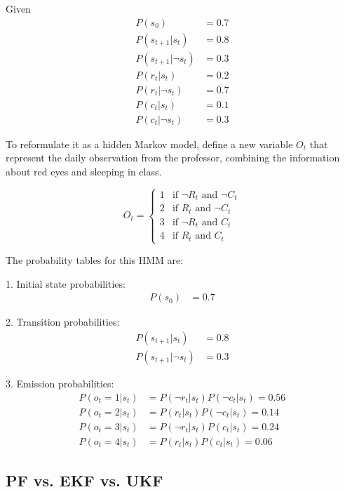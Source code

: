 \documentclass{article}
\theoremstyle{definition} %
\begin{document}
Given
\begin{align*}
        P(s_0) & =0.7 \\
        P(s_{t+1} | s_t) & =0.8 \\
        P(s_{t+1} | \neg s_t) & =0.3 \\
        P(r_t | s_t) & =0.2 \\
        P(r_t | \neg s_t) & =0.7 \\
        P(c_t | s_t) & =0.1 \\
        P(c_t | \neg s_t) & =0.3
\end{align*}

To reformulate it as a hidden Markov model, define a new variable $O_t$ that represent the daily observation from the professor, combining the information about red eyes and sleeping in class.

\[
    O_t = 
    \begin{cases} 
    1 & \text{if } \neg R_t \text{ and } \neg C_t \\
    2 & \text{if } R_t \text{ and } \neg C_t \\
    3 & \text{if } \neg R_t \text{ and } C_t \\
    4 & \text{if } R_t \text{ and } C_t
    \end{cases}
\]

The probability tables for this HMM are:

1. Initial state probabilities:
\begin{align*}
   P(s_0) & = 0.7
\end{align*}

2. Transition probabilities:
\begin{align*}
   P(s_{t+1} | s_t) & = 0.8 \\
   P(s_{t+1} | \neg s_t) & = 0.3
\end{align*}

3. Emission probabilities:
\begin{align*}
    P(o_t = 1 | s_t) & = P(\neg r_t | s_t) P(\neg c_t | s_t) = 0.56\\
    P(o_t = 2 | s_t) & = P(r_t | s_t) P(\neg c_t | s_t) = 0.14 \\
    P(o_t = 3 | s_t) & = P(\neg r_t | s_t) P(c_t | s_t) = 0.24\\
    P(o_t = 4 | s_t) & = P(r_t | s_t) P(c_t | s_t) = 0.06
\end{align*}


\subsection*{PF vs. EKF vs. UKF}
\end{document}
